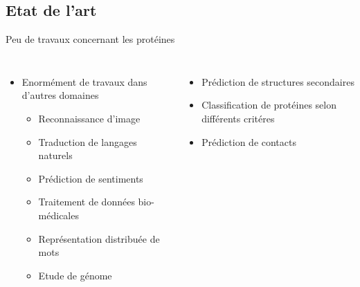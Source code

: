 \documentclass{beamer}
\begin{document}
\subsection{Etat de l'art}

\begin{frame}{Peu de travaux concernant les protéines}

    \begin{columns}
      \begin{itemize}
      \item Enormément de travaux dans d'autres domaines\pause
       \begin{itemize}
        \item Reconnaissance d'image\pause
        \item Traduction de langages naturels\pause
        \item Prédiction de sentiments\pause
        \item Traitement de données bio-médicales\pause
        \item Représentation distribuée de mots\pause
        \item Etude de génome\pause
        \end{itemize}
      \end{itemize}

    \begin{itemize}
    \item Prédiction de structures secondaires\pause
    \item Classification de protéines selon différents critéres\pause
    \item Prédiction de contacts
    \end{itemize}
  \end{columns}

\end{frame}
\end{document}
